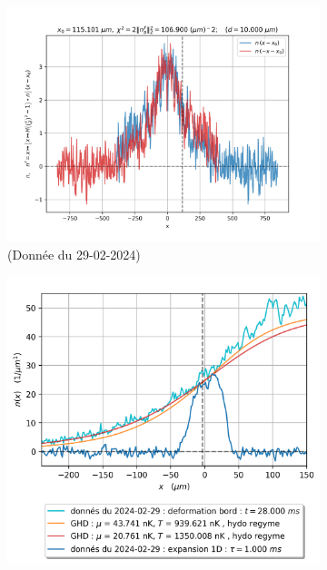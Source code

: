\documentclass[submission, Phys]{SciPost}
\begin{document}
		\begin{figure}[ht]
			\centering
			\begin{subfigure}[b]{0.24\textwidth}
				\includegraphics[width=\textwidth]{Figures/article_asymetrie_29-02-2024}
			\caption{(Donnée du 29-02-2024)}
   			\label{fig:asymetrie}	
			\end{subfigure}
			\hfill
    		\begin{subfigure}[b]{0.24\textwidth}
   				 \includegraphics[width=\textwidth]{Figures/article_simul_deformation_1_29-02-2024}
        			\caption{}

\end{subfigure}
\end{figure}
\end{document}
